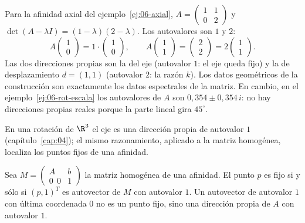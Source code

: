 \begin{ejemplo}\label{ej:06-autovalores-axial}
Para la afinidad axial del ejemplo~\ref{ej:06-axial}, \(A=\begin{pmatrix}1&1\\0&2\end{pmatrix}\)
y \(\det(A-\lambda I)=(1-\lambda)(2-\lambda)\). Los autovalores son \(1\) y \(2\):
\[
  A\begin{pmatrix}1\\0\end{pmatrix}=1\cdot\begin{pmatrix}1\\0\end{pmatrix},
  \qquad
  A\begin{pmatrix}1\\1\end{pmatrix}=\begin{pmatrix}2\\2\end{pmatrix}=2\begin{pmatrix}1\\1\end{pmatrix}.
\]
Las dos direcciones propias son la del eje (autovalor \(1\): el eje queda fijo) y la de
desplazamiento \(d=(1,1)\) (autovalor \(2\): la razón \(k\)). Los datos geométricos de la
construcción son exactamente los datos espectrales de la matriz. En cambio, en el
ejemplo~\ref{ej:06-rot-escala} los autovalores de \(A\) son \(0{,}354\pm0{,}354\,i\): no hay
direcciones propias reales porque la parte lineal gira \(45^\circ\).
\end{ejemplo}

En una rotación de \(\R^3\) el eje es una dirección propia de autovalor \(1\)
(capítulo~\ref{cap:04}); el mismo razonamiento, aplicado a la matriz homogénea, localiza los
puntos fijos de una afinidad.

\begin{proposicion}\label{prop:06-fijo-autovector}
Sea \(M=\begin{pmatrix}A&b\\0\ \ 0&1\end{pmatrix}\) la matriz homogénea de una afinidad. El
punto \(p\) es fijo si y sólo si \((p,1)^T\) es autovector de \(M\) con autovalor \(1\). Un
autovector de autovalor \(1\) con última coordenada \(0\) no es un punto fijo, sino una
dirección propia de \(A\) con autovalor \(1\).
\end{proposicion}

